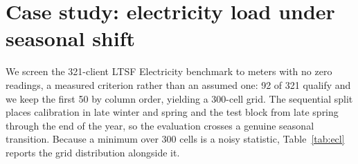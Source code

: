 \documentclass[11pt]{article}
\begin{document}
\section{Case study: electricity load under seasonal shift}\label{sec:casestudy}

We screen the 321-client LTSF Electricity benchmark to meters with no zero readings, a measured criterion rather than an assumed one: 92 of 321 qualify and we keep the first 50 by column order, yielding a 300-cell grid. The sequential split places calibration in late winter and spring and the test block from late spring through the end of the year, so the evaluation crosses a genuine seasonal transition. Because a minimum over 300 cells is a noisy statistic, Table~\ref{tab:ecl} reports the grid distribution alongside it.

\begin{table}[t]\centering\small
\caption{Electricity, 50 meters, 300-cell grid, target 0.90, mean over \eclNumConfigs\ configurations (two backbones $\times$ four horizons); adaptive rows use realised feedback.}
\label{tab:ecl}
\end{table}
\end{document}
